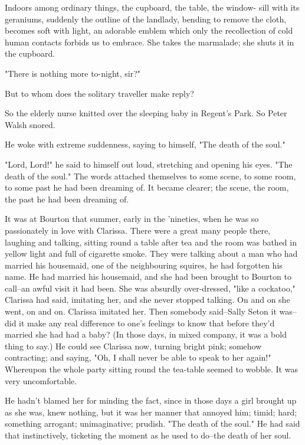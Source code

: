 \documentclass[lang=cn,10pt]{elegantbook}
\begin{document}
Indoors among ordinary things, the cupboard, the table, the window-
sill with its geraniums, suddenly the outline of the landlady,
bending to remove the cloth, becomes soft with light, an adorable
emblem which only the recollection of cold human contacts forbids
us to embrace.  She takes the marmalade; she shuts it in the
cupboard.

"There is nothing more to-night, sir?"

But to whom does the solitary traveller make reply?



So the elderly nurse knitted over the sleeping baby in Regent's
Park.  So Peter Walsh snored.

He woke with extreme suddenness, saying to himself, "The death of
the soul."

"Lord, Lord!" he said to himself out loud, stretching and opening
his eyes.  "The death of the soul."  The words attached themselves
to some scene, to some room, to some past he had been dreaming of.
It became clearer; the scene, the room, the past he had been
dreaming of.

It was at Bourton that summer, early in the 'nineties, when he was
so passionately in love with Clarissa.  There were a great many
people there, laughing and talking, sitting round a table after tea
and the room was bathed in yellow light and full of cigarette
smoke.  They were talking about a man who had married his
housemaid, one of the neighbouring squires, he had forgotten his
name.  He had married his housemaid, and she had been brought to
Bourton to call--an awful visit it had been.  She was absurdly
over-dressed, "like a cockatoo," Clarissa had said, imitating her,
and she never stopped talking.  On and on she went, on and on.
Clarissa imitated her.  Then somebody said--Sally Seton it was--did
it make any real difference to one's feelings to know that before
they'd married she had had a baby?  (In those days, in mixed
company, it was a bold thing to say.)  He could see Clarissa now,
turning bright pink; somehow contracting; and saying, "Oh, I shall
never be able to speak to her again!"  Whereupon the whole party
sitting round the tea-table seemed to wobble.  It was very
uncomfortable.

He hadn't blamed her for minding the fact, since in those days a
girl brought up as she was, knew nothing, but it was her manner
that annoyed him; timid; hard; something arrogant; unimaginative;
prudish.  "The death of the soul."  He had said that instinctively,
ticketing the moment as he used to do--the death of her soul.
\end{document}
